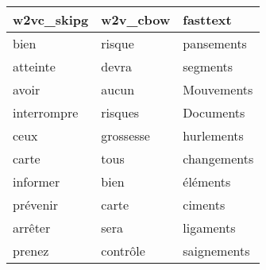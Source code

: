 \begin{tabular}{lll}
\toprule
  w2vc\_skipg &   w2v\_cbow &     fasttext \\
\midrule
        bien &     risque &   pansements \\
    atteinte &      devra &     segments \\
       avoir &      aucun &   Mouvements \\
 interrompre &    risques &    Documents \\
        ceux &  grossesse &   hurlements \\
       carte &       tous &  changements \\
    informer &       bien &     éléments \\
    prévenir &      carte &      ciments \\
     arrêter &       sera &    ligaments \\
      prenez &   contrôle &  saignements \\
\bottomrule
\end{tabular}
